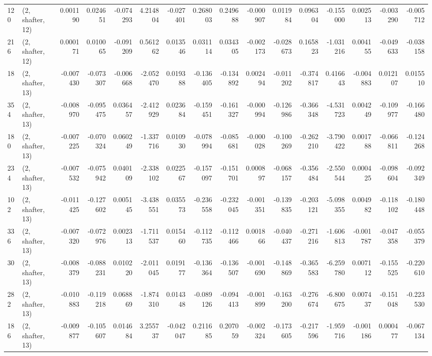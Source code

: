 \begin{tabular}{llrrrrrrrrrrrrrr}
120 &  (2, shafter, 12) &   0.001190 &  0.024651 & -0.074293 &     4.214804 &  -0.027401 &   0.268003 &   0.249688 & -0.000907 &  0.011984 &  0.096304 &   -0.155000 &  0.002513 & -0.003290 & -0.005712 \\
216 &  (2, shafter, 12) &   0.000171 &  0.010065 & -0.091209 &     0.561262 &   0.013546 &   0.031114 &   0.034305 & -0.002173 & -0.028673 &  0.165823 &   -1.031216 &  0.004155 & -0.049633 & -0.038158 \\
18  &  (2, shafter, 13) &  -0.007430 & -0.073307 & -0.006668 &    -2.052470 &   0.019388 &  -0.136405 &  -0.134892 &  0.002494 & -0.011202 & -0.374817 &    0.416643 & -0.004883 &  0.012107 &  0.015510 \\
354 &  (2, shafter, 13) &  -0.008970 & -0.095475 &  0.036457 &    -2.412929 &   0.023684 &  -0.159451 &  -0.161327 & -0.000994 & -0.126986 & -0.366348 &   -4.531723 &  0.004249 & -0.109977 & -0.166480 \\
180 &  (2, shafter, 13) &  -0.007225 & -0.070324 &  0.060249 &    -1.337716 &   0.010930 &  -0.078994 &  -0.085681 & -0.000028 & -0.100269 & -0.262210 &   -3.790422 &  0.001788 & -0.066811 & -0.124268 \\
234 &  (2, shafter, 13) &  -0.007532 & -0.075942 &  0.040109 &    -2.338102 &   0.022567 &  -0.157097 &  -0.151701 &  0.000897 & -0.068157 & -0.356484 &   -2.550544 &  0.000425 & -0.098604 & -0.092349 \\
102 &  (2, shafter, 13) &  -0.011425 & -0.127602 &  0.005145 &    -3.438551 &   0.035573 &  -0.236558 &  -0.232045 & -0.001351 & -0.139835 & -0.203121 &   -5.098355 &  0.004982 & -0.118102 & -0.180448 \\
336 &  (2, shafter, 13) &  -0.007320 & -0.072976 &  0.002313 &    -1.711537 &   0.015460 &  -0.112735 &  -0.112466 &  0.001866 & -0.040437 & -0.271216 &   -1.606813 & -0.001787 & -0.047358 & -0.055379 \\
30  &  (2, shafter, 13) &  -0.008379 & -0.088231 &  0.010220 &    -2.011045 &   0.019177 &  -0.136364 &  -0.136507 & -0.001690 & -0.148869 & -0.365583 &   -6.259780 &  0.007112 & -0.155525 & -0.220610 \\
282 &  (2, shafter, 13) &  -0.010883 & -0.119218 &  0.068869 &    -1.874310 &   0.014348 &  -0.089126 &  -0.094413 & -0.001899 & -0.163200 & -0.276674 &   -6.800675 &  0.007437 & -0.151048 & -0.223530 \\
186 &  (2, shafter, 13) &  -0.009877 & -0.105607 &  0.014684 &     3.255737 &  -0.042047 &   0.211685 &   0.207059 & -0.002324 & -0.173605 & -0.217596 &   -1.959716 & -0.001186 &  0.000477 & -0.067134 \\

\end{tabular}
